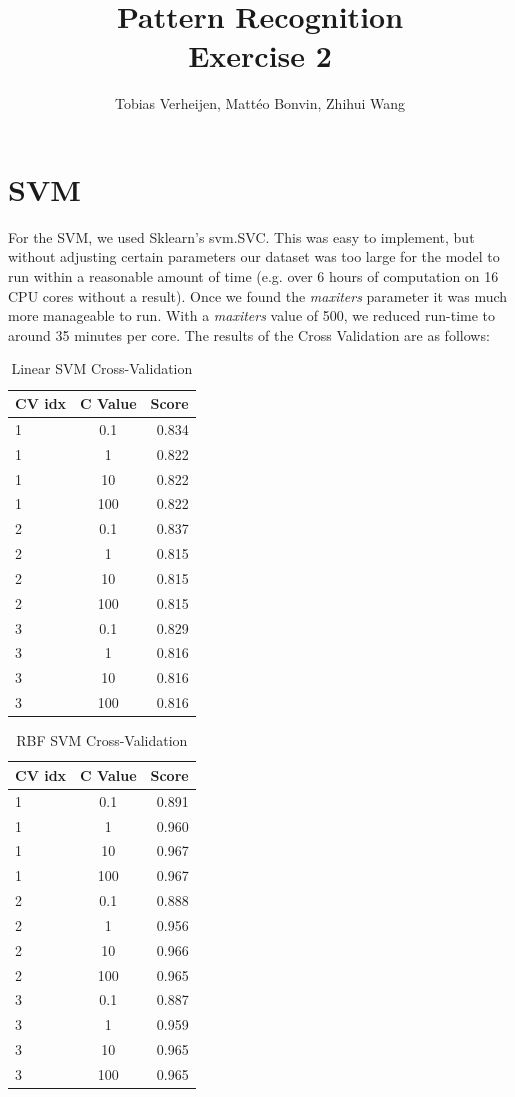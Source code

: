 \documentclass{article}
\title{Pattern Recognition \\\Large{Exercise 2}}
\author{Tobias Verheijen, Mattéo Bonvin, Zhihui Wang}
\date{}
\begin{document}
\maketitle

\section{SVM}
For the SVM, we used Sklearn's svm.SVC. This was easy to implement, but without adjusting certain parameters our dataset was too large for the model to run within a reasonable amount of time (e.g. over 6 hours of computation on 16 CPU cores without a result). Once we found the \textit{maxiters} parameter it was much more manageable to run. With a \textit{maxiters} value of 500, we reduced run-time to around 35 minutes per core.
The results of the Cross Validation are as follows:

\begin{table}[H]
\centering
\begin{tabular}{l|c|r}
CV idx & C Value & Score \\\hline
1 & 0.1 & 0.834 \\
1 & 1 & 0.822 \\
1 & 10 & 0.822 \\
1 & 100 & 0.822 \\
2 & 0.1 & 0.837 \\
2 & 1 & 0.815 \\
2 & 10 & 0.815 \\
2 & 100 & 0.815 \\
3 & 0.1 & 0.829 \\
3 & 1 & 0.816 \\
3 & 10 & 0.816 \\
3 & 100 & 0.816 \\
\end{tabular}
\caption{Linear SVM Cross-Validation}
\end{table}

\begin{table}[H]
\centering
\begin{tabular}{l|c|r}
CV idx & C Value & Score \\\hline
1 & 0.1 & 0.891 \\
1 & 1 & 0.960 \\
1 & 10 & 0.967 \\
1 & 100 & 0.967 \\
2 & 0.1 & 0.888 \\
2 & 1 & 0.956 \\
2 & 10 & 0.966 \\
2 & 100 & 0.965 \\
3 & 0.1 & 0.887 \\
3 & 1 & 0.959 \\
3 & 10 & 0.965 \\
3 & 100 & 0.965 \\
\end{tabular}
\caption{RBF SVM Cross-Validation}
\end{table}
\end{document}
